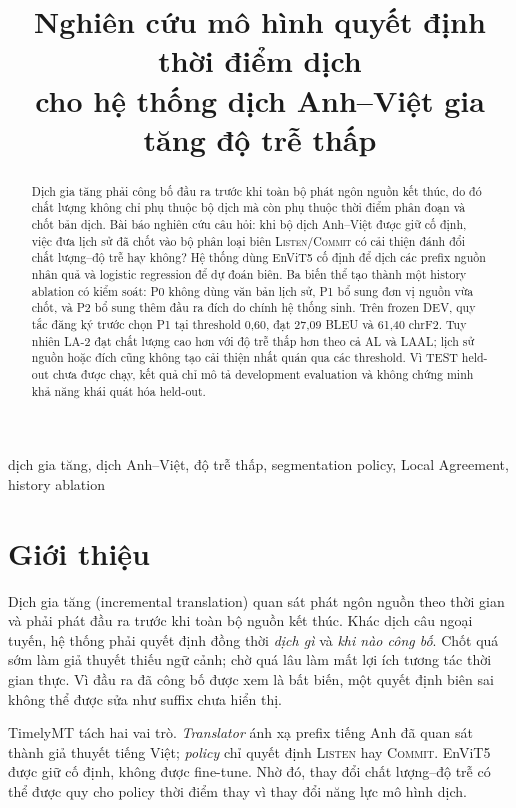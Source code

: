 \documentclass[conference]{IEEEtran}
\title{Nghiên cứu mô hình quyết định thời điểm dịch\\
cho hệ thống dịch Anh--Việt gia tăng độ trễ thấp}
\author{\IEEEauthorblockN{Đặng Quang Minh -- MSV: 24022397}
\IEEEauthorblockA{Trường Đại học Công nghệ -- Đại học Quốc gia Hà Nội\\
Mã nguồn: \href{https://github.com/MinhCYB/TimelyMT}{github.com/MinhCYB/TimelyMT}}}
\newcommand{\listen}{\ifmmode\mathrm{LISTEN}\else\textsc{Listen}\fi}
\newcommand{\commit}{\ifmmode\mathrm{COMMIT}\else\textsc{Commit}\fi}
\begin{document}
\maketitle

\begin{abstract}
Dịch gia tăng phải công bố đầu ra trước khi toàn bộ phát ngôn nguồn kết thúc, do đó chất lượng không chỉ phụ thuộc bộ dịch mà còn phụ thuộc thời điểm phân đoạn và chốt bản dịch. Bài báo nghiên cứu câu hỏi: khi bộ dịch Anh--Việt được giữ cố định, việc đưa lịch sử đã chốt vào bộ phân loại biên \listen/\commit{} có cải thiện đánh đổi chất lượng--độ trễ hay không? Hệ thống dùng EnViT5 cố định để dịch các prefix nguồn nhân quả và logistic regression để dự đoán biên. Ba biến thể tạo thành một history ablation có kiểm soát: P0 không dùng văn bản lịch sử, P1 bổ sung đơn vị nguồn vừa chốt, và P2 bổ sung thêm đầu ra đích do chính hệ thống sinh. Trên frozen DEV, quy tắc đăng ký trước chọn P1 tại threshold 0,60, đạt 27,09 BLEU và 61,40 chrF2. Tuy nhiên LA-2 đạt chất lượng cao hơn với độ trễ thấp hơn theo cả AL và LAAL; lịch sử nguồn hoặc đích cũng không tạo cải thiện nhất quán qua các threshold. Vì TEST held-out chưa được chạy, kết quả chỉ mô tả development evaluation và không chứng minh khả năng khái quát hóa held-out.
\end{abstract}

\begin{IEEEkeywords}
dịch gia tăng, dịch Anh--Việt, độ trễ thấp, segmentation policy, Local Agreement, history ablation
\end{IEEEkeywords}

\section{Giới thiệu}
Dịch gia tăng (incremental translation) quan sát phát ngôn nguồn theo thời gian và phải phát đầu ra trước khi toàn bộ nguồn kết thúc. Khác dịch câu ngoại tuyến, hệ thống phải quyết định đồng thời \emph{dịch gì} và \emph{khi nào công bố}. Chốt quá sớm làm giả thuyết thiếu ngữ cảnh; chờ quá lâu làm mất lợi ích tương tác thời gian thực. Vì đầu ra đã công bố được xem là bất biến, một quyết định biên sai không thể được sửa như suffix chưa hiển thị.

TimelyMT tách hai vai trò. \emph{Translator} ánh xạ prefix tiếng Anh đã quan sát thành giả thuyết tiếng Việt; \emph{policy} chỉ quyết định \listen{} hay \commit. EnViT5 được giữ cố định, không được fine-tune. Nhờ đó, thay đổi chất lượng--độ trễ có thể được quy cho policy thời điểm thay vì thay đổi năng lực mô hình dịch.
\end{document}
